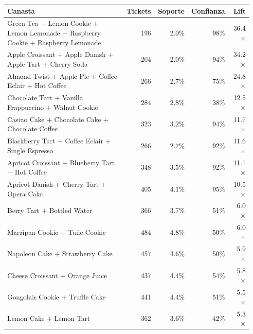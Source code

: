 \begin{tabular}{@{}p{7.6cm}rrrr@{}}
\toprule
\textbf{Canasta} & \textbf{Tickets} & \textbf{Soporte} & \textbf{Confianza} & \textbf{Lift} \\
\midrule
Green Tea $+$ Lemon Cookie $+$ Lemon Lemonade $+$ Raspberry Cookie $+$ Raspberry Lemonade & 196 & 2.0\% & 98\% & 36.4$\times$ \\
Apple Croissant $+$ Apple Danish $+$ Apple Tart $+$ Cherry Soda & 204 & 2.0\% & 94\% & 34.2$\times$ \\
Almond Twist $+$ Apple Pie $+$ Coffee Eclair $+$ Hot Coffee & 266 & 2.7\% & 75\% & 24.8$\times$ \\
Chocolate Tart $+$ Vanilla Frappuccino $+$ Walnut Cookie & 284 & 2.8\% & 38\% & 12.5$\times$ \\
Casino Cake $+$ Chocolate Cake $+$ Chocolate Coffee & 323 & 3.2\% & 94\% & 11.7$\times$ \\
Blackberry Tart $+$ Coffee Eclair $+$ Single Espresso & 266 & 2.7\% & 92\% & 11.6$\times$ \\
Apricot Croissant $+$ Blueberry Tart $+$ Hot Coffee & 348 & 3.5\% & 92\% & 11.1$\times$ \\
Apricot Danish $+$ Cherry Tart $+$ Opera Cake & 405 & 4.1\% & 95\% & 10.5$\times$ \\
Berry Tart $+$ Bottled Water & 366 & 3.7\% & 51\% & 6.0$\times$ \\
Marzipan Cookie $+$ Tuile Cookie & 484 & 4.8\% & 50\% & 6.0$\times$ \\
Napoleon Cake $+$ Strawberry Cake & 457 & 4.6\% & 50\% & 5.9$\times$ \\
Cheese Croissant $+$ Orange Juice & 437 & 4.4\% & 54\% & 5.8$\times$ \\
Gongolais Cookie $+$ Truffle Cake & 441 & 4.4\% & 51\% & 5.5$\times$ \\
Lemon Cake $+$ Lemon Tart & 362 & 3.6\% & 42\% & 5.3$\times$ \\
\bottomrule
\end{tabular}